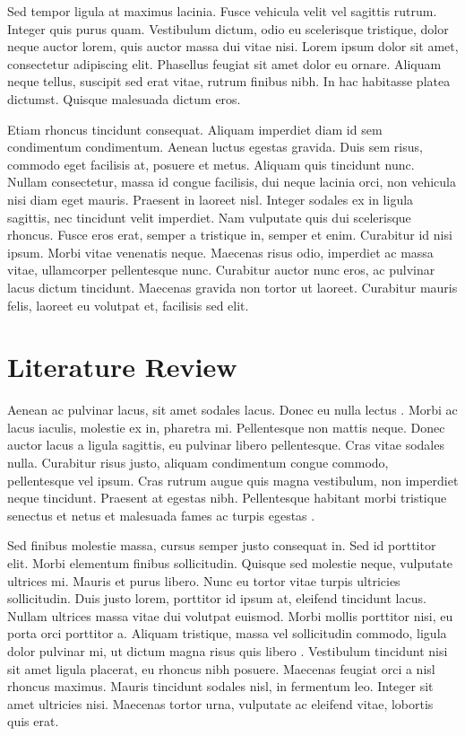 \documentclass[11pt,oneside,openright]{book}
\begin{document}
Sed tempor ligula at maximus lacinia. Fusce vehicula velit vel sagittis rutrum. Integer quis purus quam. Vestibulum dictum, odio eu scelerisque tristique, dolor neque auctor lorem, quis auctor massa dui vitae nisi. Lorem ipsum dolor sit amet, consectetur adipiscing elit. Phasellus feugiat sit amet dolor eu ornare. Aliquam neque tellus, suscipit sed erat vitae, rutrum finibus nibh. In hac habitasse platea dictumst. Quisque malesuada dictum eros.

Etiam rhoncus tincidunt consequat. Aliquam imperdiet diam id sem condimentum condimentum. Aenean luctus egestas gravida. Duis sem risus, commodo eget facilisis at, posuere et metus. Aliquam quis tincidunt nunc. Nullam consectetur, massa id congue facilisis, dui neque lacinia orci, non vehicula nisi diam eget mauris. Praesent in laoreet nisl. Integer sodales ex in ligula sagittis, nec tincidunt velit imperdiet. Nam vulputate quis dui scelerisque rhoncus. Fusce eros erat, semper a tristique in, semper et enim. Curabitur id nisi ipsum. Morbi vitae venenatis neque. Maecenas risus odio, imperdiet ac massa vitae, ullamcorper pellentesque nunc. Curabitur auctor nunc eros, ac pulvinar lacus dictum tincidunt. Maecenas gravida non tortor ut laoreet. Curabitur mauris felis, laoreet eu volutpat et, facilisis sed elit.


\chapter{Literature Review}\label{cpt:lr}

Aenean ac pulvinar lacus, sit amet sodales lacus. Donec eu nulla lectus \cite{6088955}. Morbi ac lacus iaculis, molestie ex in, pharetra mi. Pellentesque non mattis neque. Donec auctor lacus a ligula sagittis, eu pulvinar libero pellentesque. Cras vitae sodales nulla. Curabitur risus justo, aliquam condimentum congue commodo, pellentesque vel ipsum. Cras rutrum augue quis magna vestibulum, non imperdiet neque tincidunt. Praesent at egestas nibh. Pellentesque habitant morbi tristique senectus et netus et malesuada fames ac turpis egestas \cite{3D_avc_draft}.

Sed finibus molestie massa, cursus semper justo consequat in. Sed id porttitor elit. Morbi elementum finibus sollicitudin. Quisque sed molestie neque, vulputate ultrices mi. Mauris et purus libero. Nunc eu tortor vitae turpis ultricies sollicitudin. Duis justo lorem, porttitor id ipsum at, eleifend tincidunt lacus. Nullam ultrices massa vitae dui volutpat euismod. Morbi mollis porttitor nisi, eu porta orci porttitor a. Aliquam tristique, massa vel sollicitudin commodo, ligula dolor pulvinar mi, ut dictum magna risus quis libero \cite{de1962bicubic}. Vestibulum tincidunt nisi sit amet ligula placerat, eu rhoncus nibh posuere. Maecenas feugiat orci a nisl rhoncus maximus. Mauris tincidunt sodales nisl, in fermentum leo. Integer sit amet ultricies nisi. Maecenas tortor urna, vulputate ac eleifend vitae, lobortis quis erat.
\end{document}
